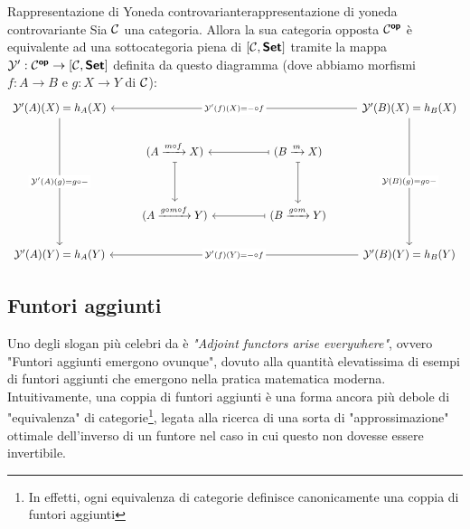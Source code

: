 \documentclass[openany]{book}
\renewcommand\C{\mc{C}}
\begin{document}
\begin{corollary}{Rappresentazione di Yoneda controvariante}{rappresentazione di yoneda controvariante}
    Sia $\C$ una categoria. Allora la sua categoria opposta $\C^\op$ è equivalente ad una sottocategoria piena di $[\C, \setcat]$ tramite la mappa $\mc{Y}' : \C^\op \to [\C, \setcat]$ definita da questo diagramma (dove abbiamo morfismi $f:A\to B$ e $g:X\to Y$ di $\C$):
    \[\begin{tikzcd}
    	{\mc{Y}'(A)(X) = h_A(X)} &&&& {\mc{Y}'(B)(X) = h_B(X)} \\
    	& {(A \xrightarrow{m\circ f} X)} && {(B \xrightarrow{m} X)} \\
    	\\
    	& {(A \xrightarrow{g\circ m\circ f} Y)} && {(B \xrightarrow{g\circ m} Y)} \\
    	{\mc{Y}'(A)(Y) = h_A(Y)} &&&& {\mc{Y}'(B)(Y) = h_B(Y)}
    	\arrow["{\mc{Y}'(A)(g) = g\circ -}"{description}, from=1-1, to=5-1]
    	\arrow["{\mc{Y}'(f)(X) = -\circ f}"{description}, from=1-5, to=1-1]
    	\arrow["{\mc{Y}(B)(g) = g\circ -}"{description}, from=1-5, to=5-5]
    	\arrow[maps to, from=2-2, to=4-2]
    	\arrow[maps to, from=2-4, to=2-2]
    	\arrow[maps to, from=2-4, to=4-4]
	    \arrow[maps to, from=4-4, to=4-2]
	    \arrow["{\mc{Y}'(f)(Y) = -\circ f}"{description}, from=5-5, to=5-1]
    \end{tikzcd}\]
\end{corollary}

\subsection{Funtori aggiunti}

Uno degli slogan più celebri da \cite{MacLane1978} è \textit{"Adjoint functors arise everywhere"}, ovvero "Funtori aggiunti emergono ovunque", dovuto alla quantità elevatissima di esempi di funtori aggiunti che emergono nella pratica matematica moderna.\\
Intuitivamente, una coppia di funtori aggiunti è una forma ancora più debole di "equivalenza" di categorie\footnote{In effetti, ogni equivalenza di categorie definisce canonicamente una coppia di funtori aggiunti}, legata alla ricerca di una sorta di "approssimazione" ottimale dell'inverso di un funtore nel caso in cui questo non dovesse essere invertibile.
\end{document}
